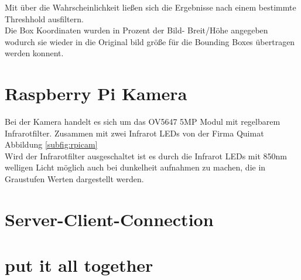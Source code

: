 Mit über die Wahrscheinlichkeit ließen sich die Ergebnisse 
nach einem bestimmte Threshhold ausfiltern.\\
Die Box Koordinaten wurden in Prozent der Bild- Breit/Höhe 
angegeben wodurch sie wieder in die Original bild größe 
für die Bounding Boxes übertragen werden konnent.




\section{Raspberry Pi Kamera}\label{sec:raspicam}


Bei der Kamera handelt es sich um das OV5647 5MP Modul mit regelbarem 
Infrarotfilter. Zusammen mit zwei Infrarot LEDs von der Firma Quimat 
Abbildung \ref{subfig:rpicam}
\\
Wird der Infrarotfilter ausgeschaltet ist es durch die Infrarot LEDs mit 
850nm welligen Licht möglich auch bei dunkelheit aufnahmen zu machen, 
die in Graustufen Werten dargestellt werden.



\section{Server-Client-Connection}\label{sec:serverclient}





\section{put it all together}\label{sec:ka}








